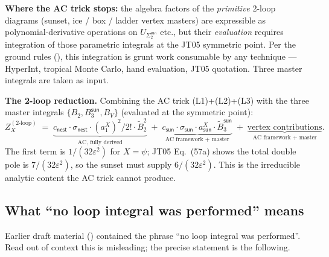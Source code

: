\documentclass[11pt,a4paper]{article}
\theoremstyle{definition}
\theoremstyle{plain}
\begin{document}
\begin{cfacbox}
\textbf{Where the AC trick stops:} the algebra factors of the
\emph{primitive} 2-loop diagrams (sunset, ice / box / ladder vertex
masters) are expressible as polynomial-derivative operations on
$U_{\Sigma_2^{\textsf{sun}}}$ etc., but their \emph{evaluation}
requires integration of those parametric integrals at the JT05
symmetric point.  Per the ground rules
(), this integration is grunt work consumable
by any technique --- HyperInt, tropical Monte Carlo, hand evaluation,
JT05 quotation.  Three master integrals are taken as input.

\textbf{The 2-loop reduction.}  Combining the AC trick (L1)+(L2)+(L3)
with the three master integrals $\{B_2, B_3^{\textsf{sun}}, B_V\}$
(evaluated at the symmetric point):
\begin{equation}
  Z_X^{(2\text{-loop})}
  \;=\;
  \underbrace{c_{\textsf{nest}} \cdot \sigma_{\textsf{nest}} \cdot
              (a^X_1)^2 / 2! \cdot \tilde B_2^2}_{\text{AC, fully derived}}
  \;+\;
  \underbrace{c_{\textsf{sun}} \cdot \sigma_{\textsf{sun}} \cdot a^X_{\textsf{sun}}
              \cdot \tilde B_3^{\textsf{sun}}}_{\text{AC framework + master}}
  \;+\;
  \underbrace{\text{vertex contributions}}_{\text{AC framework + master}}.
\end{equation}
The first term is $1/(32\varepsilon^2)$ for $X = \psi$; JT05 Eq.~(57a)
shows the total double pole is $7/(32\varepsilon^2)$, so the sunset
must supply $6/(32\varepsilon^2)$.  This is the irreducible analytic
content the AC trick cannot produce.
\end{cfacbox}

\subsection{What ``no loop integral was performed'' means}

Earlier draft material (\cite{Amarteifio2026,AmarteifioCFAC2026})
contained the phrase ``no loop integral was performed''.  Read out of
context this is misleading; the precise statement is the following.
\end{document}
